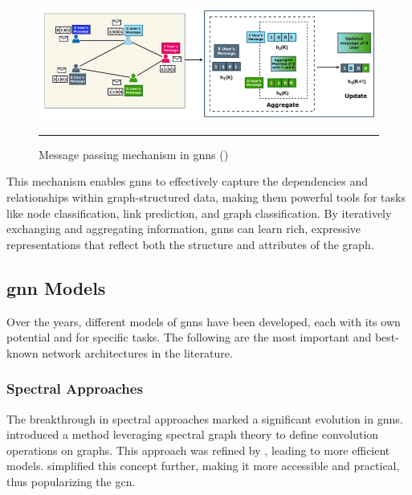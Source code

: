 \begin{figure}[htbp]
    \centering
 \includegraphics[width=.9\textwidth]{03_Figures/literature-review/gnn-message-passing-mechanism.png}
     \rule{35em}{0.5pt}
    \caption{Message passing mechanism in \glspl{gnn} (\cite{Khemani2024})} 
 \label{fig:gnn-message-passing-mechanism}
\end{figure}

This mechanism enables \glspl{gnn} to effectively capture the dependencies and relationships within graph-structured data, making them powerful tools for tasks like node classification, link prediction, and graph classification.
By iteratively exchanging and aggregating information, \glspl{gnn} can learn rich, expressive representations that reflect both the structure and attributes of the graph.

\subsection*{\gls{gnn} Models}
Over the years, different models of \glspl{gnn} have been developed, each with its own potential and for specific tasks.
The following are the most important and best-known network architectures in the literature.

\subsubsection*{Spectral Approaches}

The breakthrough in spectral approaches marked a significant evolution in \glspl{gnn}. \cite{Bruna2013} introduced a method leveraging spectral graph theory to define convolution operations on graphs. This approach was refined by \cite{Defferrard2016}, leading to more efficient models. \cite{Kipf2017} simplified this concept further, making it more accessible and practical, thus popularizing the \gls{gcn}.

\subsubsection*{}

